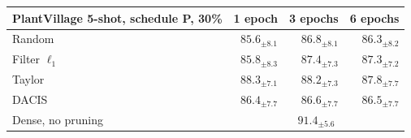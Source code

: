 \begin{tabular}{@{}lrrr@{}}
\toprule
PlantVillage 5-shot, schedule P, 30\% & 1 epoch & 3 epochs & 6 epochs \\
\midrule
Random & $85.6_{\pm8.1}$ & $86.8_{\pm8.1}$ & $86.3_{\pm8.2}$ \\
Filter $\ell_1$ & $85.8_{\pm8.3}$ & $87.4_{\pm7.3}$ & $87.3_{\pm7.2}$ \\
Taylor & $88.3_{\pm7.1}$ & $88.2_{\pm7.3}$ & $87.8_{\pm7.7}$ \\
DACIS & $86.4_{\pm7.7}$ & $86.6_{\pm7.7}$ & $86.5_{\pm7.7}$ \\
\midrule
Dense, no pruning & \multicolumn{3}{c}{$91.4_{\pm5.6}$} \\
\bottomrule
\end{tabular}